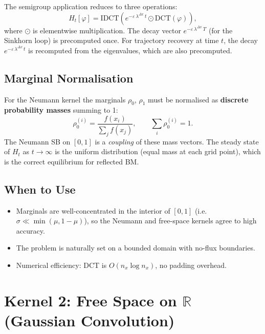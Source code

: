 \documentclass[11pt]{article}
\newcommand{\eps}{\varepsilon}
\newcommand{\dx}{\Delta x}
\newcommand{\RR}{\mathbb{R}}
\theoremstyle{remark}
\begin{document}
The semigroup application reduces to three operations:
\begin{equation}
  H_t[\varphi] = \mathrm{IDCT}\!\left(e^{-\eps\,\lambda^{\dx}\, t} \odot \mathrm{DCT}(\varphi)\right),
\end{equation}
where $\odot$ is elementwise multiplication.
The decay vector $e^{-\eps\,\lambda^{\dx}\, T}$ (for the Sinkhorn loop) is precomputed once.
For trajectory recovery at time $t$, the decay $e^{-\eps\,\lambda^{\dx}\,t}$ is recomputed
from the eigenvalues, which are also precomputed.

\subsection{Marginal Normalisation}

For the Neumann kernel the marginals $\rho_0$, $\rho_1$ must be normalised as
\textbf{discrete probability masses} summing to 1:
\begin{equation}
  \rho_0^{(i)} = \frac{f(x_i)}{\sum_j f(x_j)}, \qquad \sum_i \rho_0^{(i)} = 1.
\end{equation}
The Neumann SB on $[0,1]$ is a \textit{coupling} of these mass vectors.
The steady state of $H_t$ as $t \to \infty$ is the uniform distribution (equal mass at
each grid point), which is the correct equilibrium for reflected BM.

\subsection{When to Use}

\begin{itemize}
  \item Marginals are well-concentrated in the interior of $[0,1]$
        (i.e.\ $\sigma \ll \min(\mu, 1-\mu)$), so the Neumann and free-space kernels
        agree to high accuracy.
  \item The problem is naturally set on a bounded domain with no-flux boundaries.
  \item Numerical efficiency: DCT is $O(n_x \log n_x)$, no padding overhead.
\end{itemize}

\section{Kernel 2: Free Space on $\RR$ (Gaussian Convolution)}
\end{document}
